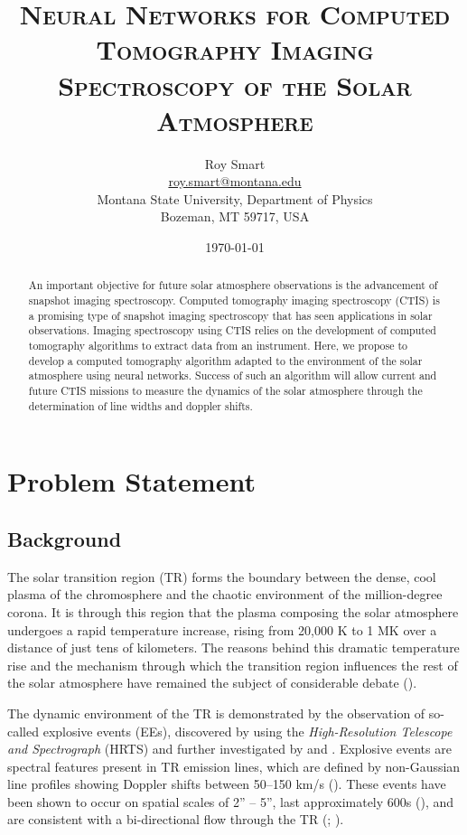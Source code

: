 \documentclass[10pt, letter]{article}
\title{\textsc{Neural Networks for Computed Tomography Imaging Spectroscopy of the Solar Atmosphere}}
\date{\today}
\author{Roy Smart \\ \url{roy.smart@montana.edu} \\ Montana State University, Department of Physics \\ Bozeman, MT 59717, USA}
\begin{document}
	\maketitle
	
	\tableofcontents
	
	\begin{abstract}
		
		An important objective for future solar atmosphere observations is the advancement of snapshot imaging spectroscopy. Computed tomography imaging spectroscopy (CTIS) is a promising type of snapshot imaging spectroscopy that has seen applications in solar observations. Imaging spectroscopy using CTIS relies on the development of computed tomography algorithms to extract data from an instrument. Here, we propose to develop a computed tomography algorithm adapted to the environment of the solar atmosphere using neural networks. Success of such an algorithm will allow current and future CTIS missions to measure the dynamics of the solar atmosphere through the determination of line widths and doppler shifts.
		
	\end{abstract}
		
	\pagebreak
	
	\section{Problem Statement}
	
		
	
		\subsection{Background} \label{back_sec} 
		
			The solar transition region (TR) forms the boundary between the dense, cool plasma of the chromosphere and the chaotic environment of the million-degree corona. It is through this region that the plasma composing the solar atmosphere undergoes a rapid temperature increase, rising from 20,000 K to 1 MK over a distance of just tens of kilometers. The reasons behind this dramatic temperature rise and the mechanism through which the transition region influences the rest of the solar atmosphere have remained the subject of considerable debate (\cite{Innes2015}).
			
			The dynamic environment of the TR is demonstrated by the observation of so-called explosive events (EEs), discovered by \cite{Brueckner1983} using the \textit{High-Resolution Telescope and Spectrograph} (HRTS) and further investigated by \cite{dere1989} and \cite{Dere1994}. Explosive events are spectral features present in TR emission lines, which are defined by non-Gaussian line profiles showing Doppler shifts between 50--150 km/s (\cite{Brueckner1983}). These events have been shown to occur on spatial scales of 2'' -- 5'', last approximately 600s (\cite{dere1989}), and are consistent with a bi-directional flow through the TR (\cite{Dere1991}; \cite{Innes1997}).
			
\end{document}
